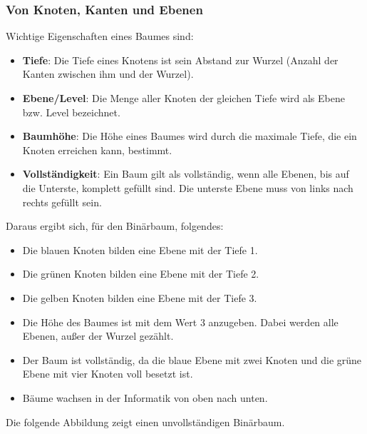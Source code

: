         \subsubsection{Von Knoten, Kanten und Ebenen}
          Wichtige Eigenschaften eines Baumes sind:
          \begin{itemize}
            \item \textbf{Tiefe}: Die Tiefe eines Knotens ist sein Abstand zur
            Wurzel (Anzahl der Kanten zwischen ihm und der Wurzel).
            \item \textbf{Ebene/Level}: Die Menge aller Knoten der gleichen
            Tiefe wird als Ebene bzw. Level bezeichnet.
            \item \textbf{Baumh\"ohe}: Die H\"ohe eines Baumes wird durch die
            maximale Tiefe, die ein Knoten erreichen kann, bestimmt.
            \item \textbf{Vollst\"andigkeit}: Ein Baum gilt als vollst\"andig,
            wenn alle Ebenen, bis auf die Unterste, komplett gef\"ullt sind. Die
            unterste Ebene muss von links nach rechts gef\"ullt sein.
          \end{itemize}
          Daraus ergibt sich, f\"ur den Bin\"arbaum, folgendes:
          \begin{itemize}
            \item Die blauen Knoten bilden eine Ebene mit der Tiefe 1.
            \item Die gr\"unen Knoten bilden eine Ebene mit der Tiefe 2.
            \item Die gelben Knoten bilden eine Ebene mit der Tiefe 3.
            \item Die H\"ohe des Baumes ist mit dem Wert 3 anzugeben. Dabei
            werden alle Ebenen, au\ss{}er der Wurzel gez\"ahlt.
            \item Der Baum ist vollst\"andig, da die blaue Ebene mit zwei Knoten
            und die gr\"une Ebene mit vier Knoten voll besetzt ist.
            \item B\"aume wachsen in der Informatik von oben nach unten.
          \end{itemize}
          Die folgende Abbildung zeigt einen unvollst\"andigen Bin\"arbaum.
          \begin{center}
          \end{center}

